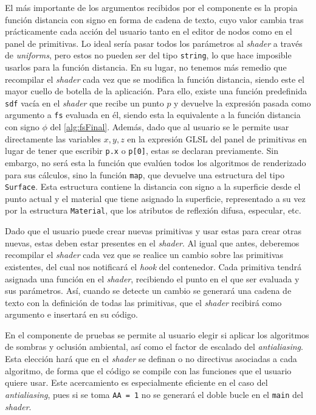 El  más importante de los argumentos recibidos por el componente es la propia función distancia con signo en forma de cadena de texto, cuyo valor cambia tras prácticamente cada acción del usuario tanto en el editor de nodos como en el panel de primitivas. Lo ideal sería pasar todos los parámetros al \textit{shader} a través de \textit{uniforms}, pero estos no pueden ser del tipo \texttt{string}, lo que hace imposible usarlos para la función distancia. En su lugar, no tenemos más remedio que recompilar el \textit{shader} cada vez que se modifica la función distancia, siendo este el mayor cuello de botella de la aplicación. Para ello, existe una función predefinida \texttt{sdf} vacía en el \textit{shader} que recibe un punto $p$ y devuelve la expresión pasada como argumento a \texttt{fs} evaluada en él, siendo esta la equivalente a la función distancia con signo $\phi$ del \autoref{alg:fsFinal}. Además, dado que al usuario se le permite usar directamente las variables $x,y,z$ en la expresión GLSL del panel de primitivas en lugar de tener que escribir \texttt{p.x} o \texttt{p[0]}, estas se declaran previamente. Sin embargo, no será esta la función que evalúen todos los algoritmos de renderizado para sus cálculos, sino la función \texttt{map}, que devuelve una estructura del tipo \texttt{Surface}. Esta estructura contiene la distancia con signo a la superficie desde el punto actual y el material que tiene asignado la superficie, representado a su vez por la estructura \texttt{Material}, que los atributos de reflexión difusa, especular, etc. 

Dado que el usuario puede crear nuevas primitivas y usar estas para crear otras nuevas, estas deben estar presentes en el \textit{shader}. Al igual que antes, deberemos recompilar el \textit{shader} cada vez que se realice un cambio sobre las primitivas existentes, del cual nos notificará el \textit{hook} del contenedor. Cada primitiva tendrá asignada una función en el \textit{shader}, recibiendo el punto en el que ser evaluada y sus parámetros. Así, cuando se detecte un cambio se generará una cadena de texto con la definición de todas las primitivas, que el \textit{shader} recibirá como argumento e insertará en su código. 

En el componente de pruebas se permite al usuario elegir si aplicar los algoritmos de sombras y oclusión ambiental, así como el factor de escalado del \textit{antialiasing}. Esta elección hará que en el \textit{shader} se definan o no directivas asociadas a cada algoritmo, de forma que el código se compile con las funciones que el usuario quiere usar. Este acercamiento es especialmente eficiente en el caso del  \textit{antialiasing}, pues si se toma \texttt{AA = 1} no se generará el doble bucle en el \texttt{main} del \textit{shader}.

